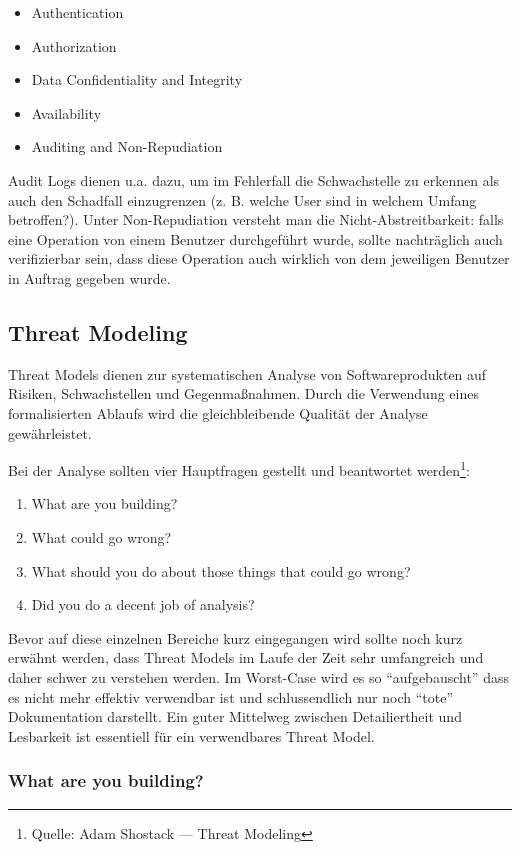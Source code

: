 \begin{itemize}
	\item Authentication
	\item Authorization
	\item Data Confidentiality and Integrity
	\item Availability
	\item Auditing and Non-Repudiation
\end{itemize}

Audit Logs dienen u.a. dazu, um im Fehlerfall die Schwachstelle zu erkennen als auch den Schadfall einzugrenzen (z. B. welche User sind in welchem Umfang betroffen?). Unter Non-Repudiation versteht man die Nicht-Abstreitbarkeit: falls eine Operation von einem Benutzer durchgeführt wurde, sollte nachträglich auch verifizierbar sein, dass diese Operation auch wirklich von dem jeweiligen Benutzer in Auftrag gegeben wurde.

\subsection{Threat Modeling}

Threat Models dienen zur systematischen Analyse von Softwareprodukten auf Risiken, Schwachstellen und Gegenmaßnahmen. Durch die Verwendung eines formalisierten Ablaufs wird die gleichbleibende Qualität der Analyse gewährleistet.

Bei der Analyse sollten vier Hauptfragen gestellt und beantwortet werden\footnote{Quelle: Adam Shostack --- Threat Modeling}:

\begin{enumerate}
	\item What are you building?
	\item What could go wrong?
	\item What should you do about those things that could go wrong?
	\item Did you do a decent job of analysis?
\end{enumerate}

Bevor auf diese einzelnen Bereiche kurz eingegangen wird sollte noch kurz erwähnt werden, dass Threat Models im Laufe der Zeit sehr umfangreich und daher schwer zu verstehen werden. Im Worst-Case wird es so ``aufgebauscht'' dass es nicht mehr effektiv verwendbar ist und schlussendlich nur noch ``tote'' Dokumentation darstellt. Ein guter Mittelweg zwischen Detailiertheit und Lesbarkeit ist essentiell für ein verwendbares Threat Model.

\subsubsection{What are you building?}

